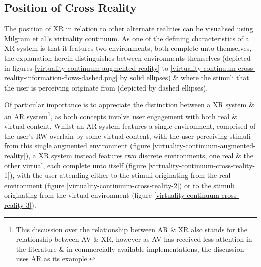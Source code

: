 

\subsection{Position of Cross Reality}

\label{positionofcrossreality}

\newcommand{\avxrfootnote}{\footnote{This discussion over the relationship between AR \& XR also stands for the relationship between AV \& XR, however as AV has received less attention in the literature \& in commercially available implementations, the discussion uses AR as its example.}}

The position of XR in relation to other alternate realities can be visualised using Milgram et al.'s virtuality continuum. As one of the defining characteristics of a XR system is that it features two environments, both complete unto themselves, the explanation herein distinguishes between environments themselves (depicted in figures \ref{virtuality-continuum-augmented-reality} to \ref{virtuality-continuum-cross-reality-information-flows-dashed.png} by solid ellipses) \& where the stimuli that the user is perceiving originate from (depicted by dashed ellipses).


Of particular importance is to appreciate the distinction between a XR system \& an AR system\avxrfootnote{}, as both concepts involve user engagement with both real \& virtual content. Whilst an AR system features a single environment, comprised of the user's RW overlain by some virtual content, with the user perceiving stimuli from this single augmented environment (figure \ref{virtuality-continuum-augmented-reality}), a XR system instead features two discrete environments, one real \& the other virtual, each complete unto itself (figure \ref{virtuality-continuum-cross-reality-1}), with the user attending either to the stimuli originating from the real environment (figure \ref{virtuality-continuum-cross-reality-2}) or to the stimuli originating from the virtual environment (figure \ref{virtuality-continuum-cross-reality-3}).

